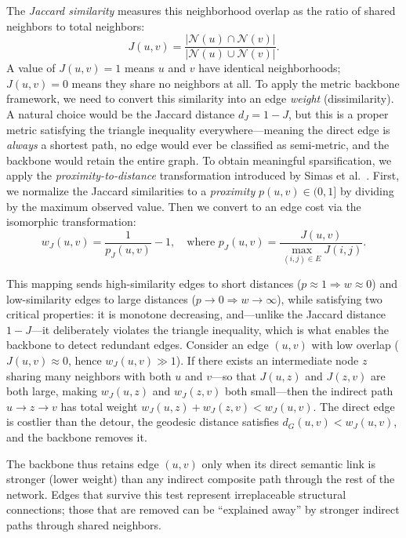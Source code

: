 \documentclass[conference]{IEEEtran}
\begin{document}
The \emph{Jaccard similarity} measures this neighborhood overlap as the ratio of shared neighbors to total neighbors:
\begin{equation}
    J(u, v) = \frac{|\mathcal{N}(u) \cap \mathcal{N}(v)|}{|\mathcal{N}(u) \cup \mathcal{N}(v)|}.
    \label{eq:jaccard_sim}
\end{equation}
A value of $J(u,v) = 1$ means $u$ and $v$ have identical neighborhoods; $J(u,v) = 0$ means they share no neighbors at all. To apply the metric backbone framework, we need to convert this similarity into an edge \emph{weight} (dissimilarity). A natural choice would be the Jaccard distance $d_J = 1 - J$, but this is a proper metric satisfying the triangle inequality everywhere---meaning the direct edge is \emph{always} a shortest path, no edge would ever be classified as semi-metric, and the backbone would retain the entire graph. To obtain meaningful sparsification, we apply the \emph{proximity-to-distance} transformation introduced by Simas et al.~\cite{simas2021}. First, we normalize the Jaccard similarities to a \emph{proximity} $p(u,v) \in (0, 1]$ by dividing by the maximum observed value. Then we convert to an edge cost via the isomorphic transformation:
\begin{equation}
    w_J(u, v) = \frac{1}{p_J(u, v)} - 1, \quad \text{where } p_J(u,v) = \frac{J(u,v)}{\max_{(i,j) \in E} J(i,j)}.
    \label{eq:jaccard_weight}
\end{equation}

This mapping sends high-similarity edges to short distances ($p \approx 1 \Rightarrow w \approx 0$) and low-similarity edges to large distances ($p \to 0 \Rightarrow w \to \infty$), while satisfying two critical properties: it is monotone decreasing, and---unlike the Jaccard distance $1 - J$---it deliberately violates the triangle inequality, which is what enables the backbone to detect redundant edges. Consider an edge $(u,v)$ with low overlap ($J(u,v) \approx 0$, hence $w_J(u,v) \gg 1$). If there exists an intermediate node $z$ sharing many neighbors with both $u$ and $v$---so that $J(u,z)$ and $J(z,v)$ are both large, making $w_J(u,z)$ and $w_J(z,v)$ both small---then the indirect path $u \to z \to v$ has total weight $w_J(u,z) + w_J(z,v) < w_J(u,v)$. The direct edge is costlier than the detour, the geodesic distance satisfies $d_G(u,v) < w_J(u,v)$, and the backbone removes it.

The backbone thus retains edge $(u,v)$ only when its direct semantic link is stronger (lower weight) than any indirect composite path through the rest of the network. Edges that survive this test represent irreplaceable structural connections; those that are removed can be ``explained away'' by stronger indirect paths through shared neighbors.
\end{document}
